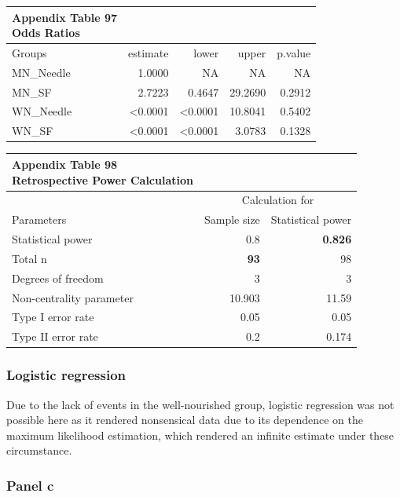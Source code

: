 \documentclass[
  12pt,
  letterpaper,
]{article}
\begin{document}
\begingroup
\fontsize{12.0pt}{14.4pt}\selectfont
\begin{longtable}{l|rrrr}
\caption*{
{\large \textbf{Appendix Table 97}} \\ 
{\small \textbf{Odds Ratios}}
} \\ 
\toprule
Groups & {estimate} & {lower} & {upper} & {p.value} \\ 
\midrule\addlinespace[2.5pt]
MN\_Needle & 1.0000 & NA & NA & NA \\ 
MN\_SF & 2.7223 & 0.4647 & 29.2690 & 0.2912 \\ 
WN\_Needle & <0.0001 & <0.0001 & 10.8041 & 0.5402 \\ 
WN\_SF & <0.0001 & <0.0001 &  3.0783 & 0.1328 \\ 
\bottomrule
\end{longtable}
\endgroup

\begingroup
\fontsize{12.0pt}{14.4pt}\selectfont
\begin{longtable}{l|rr}
\caption*{
{\large \textbf{Appendix Table 98}} \\ 
{\small \textbf{Retrospective Power Calculation}}
} \\ 
\toprule
 & \multicolumn{2}{c}{Calculation for} \\ 
\cmidrule(lr){2-3}
Parameters & {Sample size} & {Statistical power} \\ 
\midrule\addlinespace[2.5pt]
Statistical power & 0.8 & {\bfseries 0.826} \\ 
Total n & {\bfseries 93} & 98 \\ 
Degrees of freedom & 3 & 3 \\ 
Non-centrality parameter & 10.903 & 11.59 \\ 
Type I error rate & 0.05 & 0.05 \\ 
Type II error rate & 0.2 & 0.174 \\ 
\bottomrule
\end{longtable}
\endgroup

\subsubsection{Logistic regression}\label{logistic-regression-2}

Due to the lack of events in the well-nourished group, logistic regression was not possible here as it rendered nonsensical data due to its dependence on the maximum likelihood estimation, which rendered an infinite estimate under these circumstance.

\subsubsection{Panel c}\label{panel-c-1}
\end{document}
